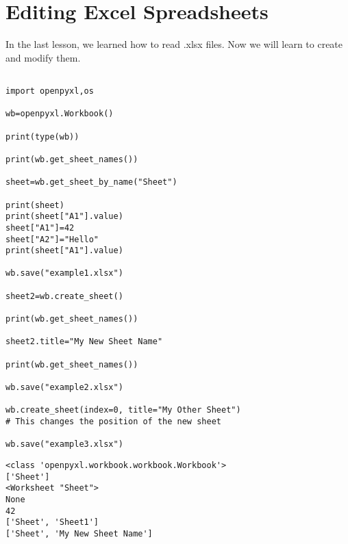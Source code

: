 \documentclass[11pt]{article}
\begin{document}
\section{Editing Excel Spreadsheets}
\label{sec:org995b376}

In the last lesson, we learned how to read .xlsx files. Now we will learn to create and modify them.

\begin{verbatim}

import openpyxl,os

wb=openpyxl.Workbook()

print(type(wb))

print(wb.get_sheet_names())

sheet=wb.get_sheet_by_name("Sheet")

print(sheet)
print(sheet["A1"].value)
sheet["A1"]=42
sheet["A2"]="Hello"
print(sheet["A1"].value)

wb.save("example1.xlsx")

sheet2=wb.create_sheet()

print(wb.get_sheet_names())

sheet2.title="My New Sheet Name"

print(wb.get_sheet_names())

wb.save("example2.xlsx")

wb.create_sheet(index=0, title="My Other Sheet")
# This changes the position of the new sheet

wb.save("example3.xlsx")

\end{verbatim}

\begin{verbatim}
<class 'openpyxl.workbook.workbook.Workbook'>
['Sheet']
<Worksheet "Sheet">
None
42
['Sheet', 'Sheet1']
['Sheet', 'My New Sheet Name']
\end{verbatim}
\end{document}

